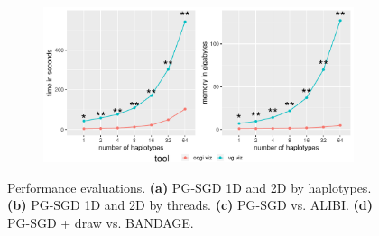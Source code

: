 \begin{figure}[!htb]
\begin{subfigure}[t]{0.4\textwidth}
		\label{fig:alibi}
	\end{subfigure}
	\begin{subfigure}[t]{0.4\textwidth}
		\centering
		\caption{}
		\includegraphics[width=\linewidth]{fig/performance/TODO_by_2d_draw_bandage_time_ram.pdf}
		\label{fig:bandage}
	\end{subfigure}
	\caption{
		Performance evaluations.
		\textbf{(a)} PG-SGD 1D and 2D by haplotypes. \textbf{(b)} PG-SGD 1D and 2D by threads. \textbf{(c)} PG-SGD vs. ALIBI. \textbf{(d)} PG-SGD + draw vs. BANDAGE.
	}
	\label{fig:performance}
\end{figure}